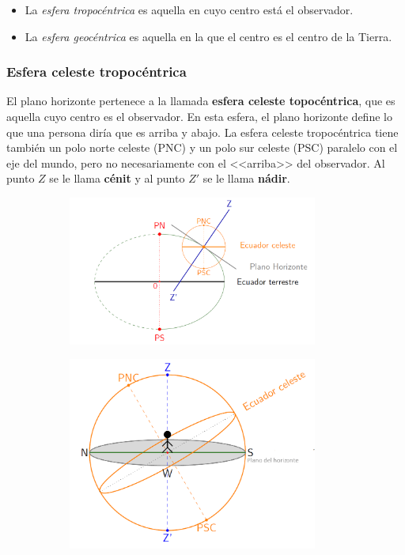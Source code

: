 \begin{itemize}
	\item La \textit{esfera tropocéntrica} es aquella en cuyo centro está el observador.
	\item La \textit{esfera geocéntrica} es aquella en la que el centro es el centro de la Tierra.
\end{itemize}

\subsubsection{Esfera celeste tropocéntrica}


El plano horizonte pertenece a la llamada \textbf{esfera celeste topocéntrica}, que es aquella cuyo centro es el observador. En esta esfera, el plano horizonte define lo que una persona diría que es arriba y abajo. La esfera celeste tropocéntrica tiene también un polo norte celeste (PNC) y un polo sur celeste (PSC) paralelo con el eje del mundo, pero no necesariamente con el <<arriba>> del observador. Al punto $Z$ se le llama \textbf{cénit} y al punto $Z'$ se le llama \textbf{nádir}.

\begin{figure}[h]
	\centering
	\begin{subfigure}{0.55\textwidth}
		\centering
		\includegraphics[width=0.9\textwidth]{Cuerpo/Imagenes/01_Plano.png}
	\end{subfigure}
	\hfill
	\begin{subfigure}{0.4\textwidth}
		\centering
		\includegraphics[width=0.9\textwidth]{Cuerpo/Imagenes/01_Esfera.png}
	\end{subfigure}
\end{figure}


